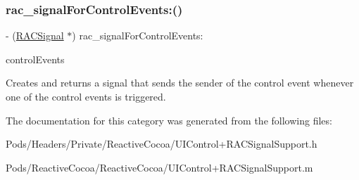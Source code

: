 \subsubsection{\texorpdfstring{rac\+\_\+signal\+For\+Control\+Events\+:()}{rac\_signalForControlEvents:()}\hspace{0.1cm}{\footnotesize\ttfamily [3/3]}}
{\footnotesize\ttfamily -\/ (\mbox{\hyperlink{interface_r_a_c_signal}{R\+A\+C\+Signal}} $\ast$) rac\+\_\+signal\+For\+Control\+Events\+: \begin{DoxyParamCaption}\item[{(U\+I\+Control\+Events)}]{control\+Events }\end{DoxyParamCaption}}

Creates and returns a signal that sends the sender of the control event whenever one of the control events is triggered. 

The documentation for this category was generated from the following files\+:\begin{DoxyCompactItemize}
\item 
Pods/\+Headers/\+Private/\+Reactive\+Cocoa/U\+I\+Control+\+R\+A\+C\+Signal\+Support.\+h\item 
Pods/\+Reactive\+Cocoa/\+Reactive\+Cocoa/U\+I\+Control+\+R\+A\+C\+Signal\+Support.\+m\end{DoxyCompactItemize}
